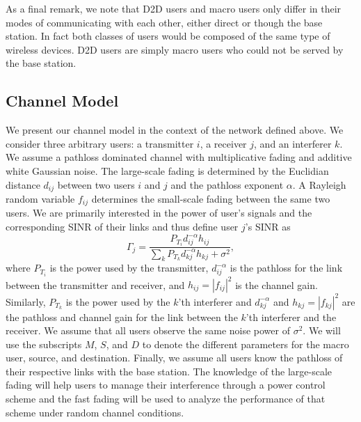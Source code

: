 \documentclass[10pt, final, journal, letterpaper,oneside, twocolumn]{IEEEtran}
\begin{document}
As a final remark, we note that D2D users and macro users only differ in their modes of communicating with each other, either direct or though the base station.  In fact both classes of users would be composed of the same type of wireless devices.  D2D users are simply macro users who could not be served by the base station.  


\subsection{Channel Model}

We present our channel model in the context of the network defined above.  We consider three arbitrary users: a transmitter $i$, a receiver $j$, and an interferer $k$.  We assume a pathloss dominated channel with multiplicative fading and additive white Gaussian noise.  The large-scale fading is determined by the Euclidian distance $d_{ij}$ between two users $i$ and $j$ and the pathloss exponent $\alpha$.  A Rayleigh random variable $f_{ij}$ determines the small-scale fading between the same two users. We are primarily interested in the power of user's signals and the corresponding SINR of their links and thus define user $j$'s SINR as
\begin{equation}
\Gamma_j = \dfrac{P_{T_{i}}d_{ij}^{-\alpha}h_{ij}}{\sum\limits_k P_{T_{k}}d_{kj}^{-\alpha}h_{kj} + \sigma^2},
\end{equation}
where $P_{T_{i}}$ is the power used by the transmitter, $d_{ij}^{-\alpha}$ is the pathloss for the link between the transmitter and receiver, and $h_{ij}=|f_{ij}|^2$ is the channel gain.  Similarly, $P_{T_{k}}$ is the power used by the $k$'th interferer and $d_{kj}^{-\alpha}$ and $h_{kj}=|f_{kj}|^2$ are the pathloss and channel gain for the link between the $k$'th interferer and the receiver.  We assume that all users observe the same noise power of $\sigma^2$.  We will use the subscripts $M$, $S$, and $D$ to denote the different parameters for the macro user, source, and destination.  Finally, we assume all users know the pathloss of their respective links with the base station.  The knowledge of the large-scale fading will help users to manage their interference through a power control scheme and the fast fading will be used to analyze the performance of that scheme under random channel conditions.  
\end{document}
